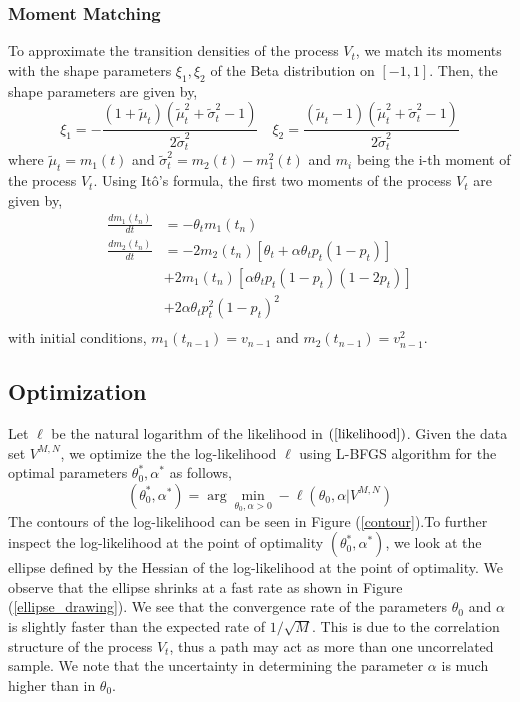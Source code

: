 \documentclass[10pt,twocolumn,letterpaper]{article}
\newcommand{\E}{\mathbb{E}}
\begin{document}
\subsubsection*{ Moment Matching}
To approximate the transition densities of  the process $V_t$, we match its moments with the shape parameters $\xi_1, \xi_2$ of the Beta distribution on $[-1,1]$.  Then, the shape parameters are given by,
\begin{equation}
\xi_1 = - \frac{(1+\tilde{\mu}_t )(\tilde{\mu}_t^2 + \tilde{\sigma}_t^2 -1)}{2 \tilde{\sigma}_t^2} \quad \xi_2=  \frac{(\tilde{\mu}_t-1 )(\tilde{\mu}_t^2 + \tilde{\sigma}_t^2 -1)}{2 \tilde{\sigma}_t^2} \label{param_transformed_beta}
\end{equation}
where $\tilde{\mu}_t = m_1(t)$ and $\tilde{\sigma}_t^2= m_2(t)- m_1^2(t)$ and $m_i$ being the i-th moment of the process $V_t$. Using It\^{o}'s formula, the first two moments  of the  process $V_t$ are given by,
\begin{equation}
\begin{split}
 \frac{dm_1(t_n)}{dt} &=    - \theta_t m_1(t_n)  \\
\frac{d m_{2}(t_n)}{dt}&= -2m_{2}(t_n) [\theta_t + \alpha \theta_t p_t(1-p_t) ] \\
&+ 2m_{1}(t_n)[\alpha \theta_t p_t (1-p_t) (1-2p_t)] \\
&+ 2\alpha \theta_t p_t^2(1-p_t)^2  \\
\end{split}
\end{equation}
with initial conditions, $m_1(t_{n-1})= v_{n-1}$ and $m_2(t_{n-1})= v_{n-1}^2$.
\subsection{Optimization}
Let $\ell$ be the natural logarithm  of the likelihood in $(\ref{likelihood})$. Given the data set $V^{M,N}$, we  optimize the the log-likelihood $\ell$  using L-BFGS algorithm  for the optimal parameters $\theta_0^* , \alpha^*$ as follows,
\begin{equation}
(\theta_0^* , \alpha^* ) = \arg \underset{\theta_0, \alpha>0}{\min} - \ell( \theta_0,  \alpha | V^{M,N} )
\end{equation}
The contours of the  log-likelihood can be seen in Figure (\ref{contour}).To further inspect the log-likelihood at the point of optimality $(\theta_0^* , \alpha^* )$, we look at the ellipse defined by the  Hessian of the log-likelihood at the point of optimality.  We observe that the ellipse shrinks at a fast rate as shown in Figure (\ref{ellipse_drawing}). We see that  the convergence rate of the parameters $\theta_0$ and $\alpha$ is slightly faster than the expected rate of $1/\sqrt{M}$. This is due to the correlation structure of the process $V_t$, thus a path may act  as more than one  uncorrelated sample. We note that the uncertainty in determining the parameter $\alpha$  is much higher than  in $\theta_0$.
\end{document}
